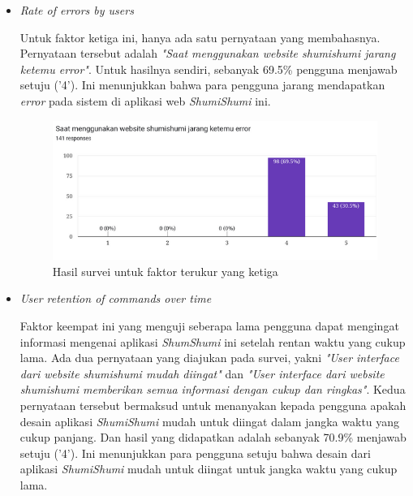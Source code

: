 \documentclass[a4paper]{article}
\begin{document}
\begin{enumerate}
\begin{itemize}
        \item \textit{Rate of errors by users}
        
        Untuk faktor ketiga ini, hanya ada satu pernyataan yang membahasnya. Pernyataan tersebut adalah \textit{"Saat menggunakan website shumishumi jarang ketemu error"}. Untuk hasilnya sendiri, sebanyak 69.5\% pengguna menjawab setuju ('4'). Ini menunjukkan bahwa para pengguna jarang mendapatkan \textit{error} pada sistem di aplikasi web \textit{ShumiShumi} ini. 
        \newpage
        \begin{figure}[h]
            \centering
            \includegraphics[scale=0.50]{images/evaluasi ui user 2/Survei 2 - Pertanyaan 8.png}
            \caption{Hasil survei untuk faktor terukur yang ketiga}
        \end{figure}

        \item \textit{User retention of commands over time}
        
        Faktor keempat ini yang menguji seberapa lama pengguna dapat mengingat informasi mengenai aplikasi \textit{ShumShumi} ini setelah rentan waktu yang cukup lama. Ada dua pernyataan yang diajukan pada survei, yakni \textit{"User interface dari website shumishumi mudah diingat"} dan \textit{"User interface dari website shumishumi memberikan semua informasi dengan cukup dan ringkas"}. Kedua pernyataan tersebut bermaksud untuk menanyakan kepada pengguna apakah desain aplikasi \textit{ShumiShumi} mudah untuk diingat dalam jangka waktu yang cukup panjang. Dan hasil yang didapatkan adalah sebanyak 70.9\% menjawab setuju ('4'). Ini menunjukkan para pengguna setuju bahwa desain dari aplikasi \textit{ShumiShumi} mudah untuk diingat untuk jangka waktu yang cukup lama. 


\end{itemize}
\end{enumerate}
\end{document}
